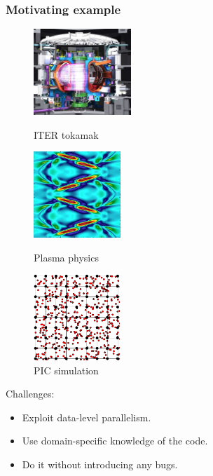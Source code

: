 \begin{frame}[fragile]
\frametitle{Motivating example}

\begin{figure}[H]
\centering
\begin{minipage}{0.275\linewidth}
\centering
\includegraphics[width=\textwidth, height=3.25cm]{images/ITER_tokamak}
\caption{\footnotesize ITER tokamak}
\label{fig:figure1}
\end{minipage}%
\hspace{0.5cm}
\begin{minipage}{0.275\linewidth}
\centering
\includegraphics[width=\textwidth, height=3.25cm]{images/plasma_physics}
\caption{\footnotesize Plasma physics}
\label{fig:figure2}
\end{minipage}%
\hspace{0.5cm}
\begin{minipage}{0.275\linewidth}
\centering
\includegraphics[width=\textwidth, height=3.25cm]{images/PIC_simulation}
\caption{\footnotesize PIC simulation}
\label{fig:figure2}
\end{minipage}
\end{figure}

\bigskip

Challenges:
\begin{itemize}
	\item Exploit data-level parallelism. \pause
	\item Use domain-specific knowledge of the code. \pause
	\item Do it without introducing any bugs. \pause
\end{itemize}

\end{frame}


